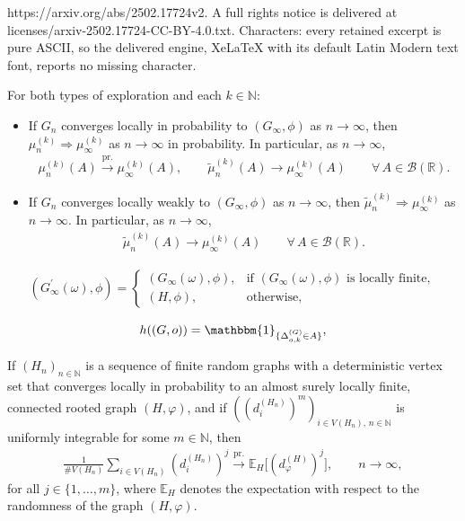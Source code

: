 \documentclass[10pt,a4paper]{amsart}
\newcommand{\E}{\mathbb E}
\newcommand{\N}{\mathbb N}
\newcommand{\R}{\mathbb R}
\newcommand{\prob}{\overset{\mathrm{pr.}}{\longrightarrow}}
\newcommand{\weak}{\Longrightarrow}
\begin{document}
https://arxiv.org/abs/2502.17724v2. A full rights notice is delivered at licenses/arxiv-2502.17724-CC-BY-4.0.txt. Characters: every retained excerpt is pure ASCII, so the delivered engine, XeLaTeX with its default Latin Modern text font, reports no missing character.
\begin{theorem}
\label{thm1}
For both types of exploration and each $k\in\N$:
\begin{itemize}
\item[\rm{(a)}] 
If $G_{n}$ converges locally in probability to $(G_{\infty},\phi)$ as $n\to\infty$, then $\mu_{n}^{(k)} \weak \mu^{(k)}_{\infty}$ as $n\to\infty$ in probability. In particular, as $n\to\infty$,
\begin{align*}
\mu_{n}^{(k)} (A) \prob \mu^{(k)}_{\infty} (A), \qquad 
\tilde{\mu}_{n}^{(k)} (A) \to \mu^{(k)}_{\infty} (A) \qquad \forall\,A \in \mathcal{B}(\R).
\end{align*}
\item[\rm{(b)}] 
If $G_{n}$ converges locally weakly to $(G_{\infty},\phi)$ as $n\to\infty$, then $\tilde{\mu}_{n}^{(k)} \weak \mu^{(k)}_{\infty}$ as $n\to\infty$. In particular, as $n\to\infty$,
\begin{align*}
\tilde{\mu}_{n}^{(k)} (A) \to \mu^{(k)}_{\infty} (A) \qquad \forall\,A \in \mathcal{B}(\R).
\end{align*}
\end{itemize}
\end{theorem}

\begin{align}
\label{Ginfinity}
(G_{\infty}^{\prime}(\omega),\phi) = 
\left\{
\begin{array}{ll}
(G_{\infty}(\omega),\phi), &\text{if }(G_{\infty}(\omega),\phi) \text{ is locally finite}, \\
(H,\phi), &\text{otherwise},
\end{array} \right.
\end{align}

\begin{align}
\label{hindicator}
h((G,o))=\mathbbm{1}_{\{\Delta_{o,k}^{(G)}\in A\}},
\end{align}

\begin{lemma}
\label{lem}
If $(H_{n})_{n\in\N}$ is a sequence of finite random graphs with a deterministic vertex set that converges locally in probability to an almost surely locally finite, connected rooted graph $(H, \varphi)$, and if $((d_{i}^{(H_{n})})^{m})_{i\in V(H_{n}),\, n\in\N}$ is uniformly integrable for some $m \in \N$, then
\begin{align*}
\frac{1}{\#V(H_{n})}\sum_{i\in V(H_{n})}(d_{i}^{(H_{n})})^{j}\prob \E_{H}\big[(d_{\varphi}^{(H)})^{j}\big],\qquad n\to\infty ,
\end{align*}
for all $j\in\{1,\ldots,m\}$, where $\E_{H}$ denotes the expectation with respect to the randomness of the graph $(H, \varphi)$. 
\end{lemma}
\end{document}
